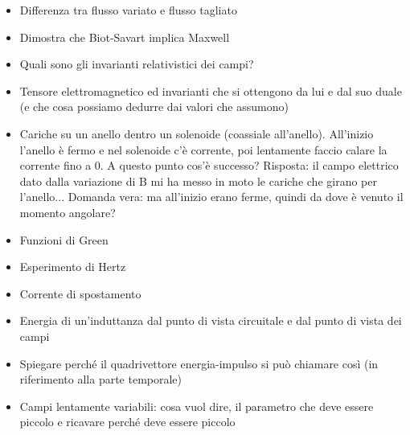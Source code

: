 \documentclass[a4paper,NoNotes,GeneralMath]{stdmdoc}
\begin{document}
\begin{itemize}
		\item Differenza tra flusso variato e flusso tagliato
		\item Dimostra che Biot-Savart implica Maxwell
		\item Quali sono gli invarianti relativistici dei campi?
		\item Tensore elettromagnetico ed invarianti che si ottengono da lui e dal suo duale (e che cosa possiamo dedurre dai valori che assumono)
		\item Cariche su un anello dentro un solenoide (coassiale all'anello). All'inizio l'anello è fermo e nel solenoide c'è corrente, poi lentamente faccio calare la corrente fino a 0. A questo punto cos'è successo? Risposta: il campo elettrico dato dalla variazione di B mi ha messo in moto le cariche che girano per l'anello... Domanda vera: ma all'inizio erano ferme, quindi da dove è venuto il momento angolare?
		\item Funzioni di Green
		\item Esperimento di Hertz
		\item Corrente di spostamento
		\item Energia di un'induttanza dal punto di vista circuitale e dal punto di vista dei campi
		\item Spiegare perché il quadrivettore energia-impulso si può chiamare così (in riferimento alla parte temporale)
		\item Campi lentamente variabili: cosa vuol dire, il parametro che deve essere piccolo e ricavare perché deve essere piccolo
	\end{itemize}
\end{document}
